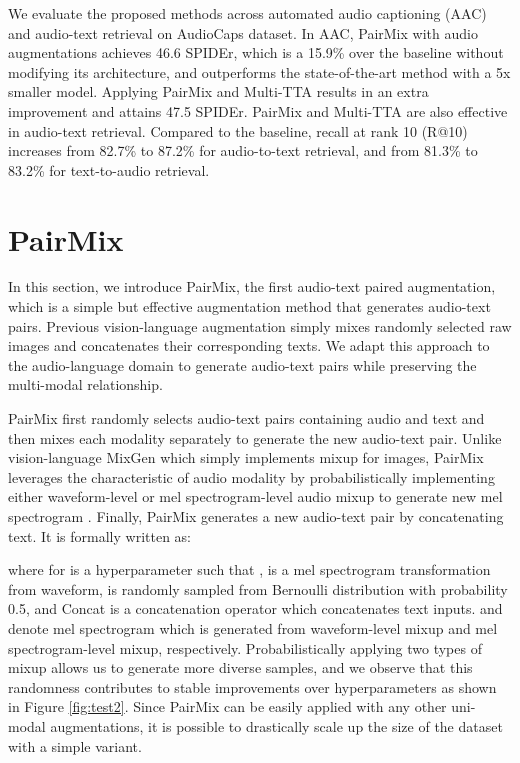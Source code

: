 \documentclass{INTERSPEECH2023}
\begin{document}
We evaluate the proposed methods across automated audio captioning (AAC) and audio-text retrieval on AudioCaps dataset. In AAC, PairMix with audio augmentations achieves 46.6 SPIDEr, which is a 15.9\% over the baseline without modifying its architecture, and outperforms the state-of-the-art method with a 5x smaller model. Applying PairMix and Multi-TTA results in an extra improvement and attains 47.5 SPIDEr. PairMix and Multi-TTA are also effective in audio-text retrieval. Compared to the baseline, recall at rank 10 (R@10) increases from 82.7\% to 87.2\% for audio-to-text retrieval, and from 81.3\% to 83.2\% for text-to-audio retrieval.

\section{PairMix}
\label{sec:format}

In this section, we introduce PairMix, the first audio-text paired augmentation, which is a simple but effective augmentation method that generates audio-text pairs. Previous vision-language augmentation \cite{hao2023mixgen} simply mixes randomly selected raw images and concatenates their corresponding texts. We adapt this approach to the audio-language domain to generate audio-text pairs while preserving the multi-modal relationship.

PairMix first randomly selects  audio-text pairs  containing audio  and text  and then mixes each modality separately to generate the new audio-text pair. Unlike vision-language MixGen which simply implements mixup for images, PairMix leverages the characteristic of audio modality by probabilistically implementing either waveform-level or mel spectrogram-level audio mixup to generate new mel spectrogram . Finally, PairMix generates a new audio-text pair  by concatenating text. It is formally written as:

where  for  is a hyperparameter such that ,  is a mel spectrogram transformation from waveform,  is randomly sampled from Bernoulli distribution with probability 0.5, and Concat is a concatenation operator which concatenates text inputs.  and  denote mel spectrogram which is generated from waveform-level mixup and mel spectrogram-level mixup, respectively. Probabilistically applying two types of mixup allows us to generate more diverse samples, and we observe that this randomness contributes to stable improvements over hyperparameters as shown in Figure \ref{fig:test2}. Since PairMix can be easily applied with any other uni-modal augmentations, it is possible to drastically scale up the size of the dataset with a simple variant.
\end{document}
